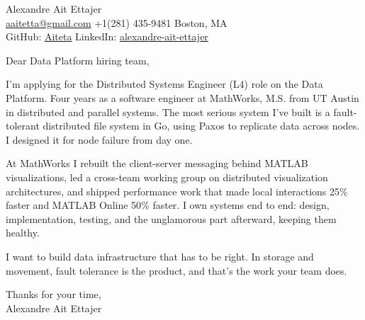 \documentclass{article}
\begin{document}
\begin{flushleft}
    {\Large Alexandre Ait Ettajer} \\
    \href{mailto:aaitetta@gmail.com}{aaitetta@gmail.com} \quad +1(281) 435-9481 \quad Boston, MA \\
    GitHub: \href{https://github.com/aiteta}{Aiteta} \quad LinkedIn: \href{https://www.linkedin.com/in/alexandre-ait-ettajer-65740b170/}{alexandre-ait-ettajer} \\
\end{flushleft}

\vspace{1em}

Dear Data Platform hiring team,

I'm applying for the Distributed Systems Engineer (L4) role on the Data Platform. Four years as a software engineer at MathWorks, M.S. from UT Austin in distributed and parallel systems. The most serious system I've built is a fault-tolerant distributed file system in Go, using Paxos to replicate data across nodes. I designed it for node failure from day one.

At MathWorks I rebuilt the client-server messaging behind MATLAB visualizations, led a cross-team working group on distributed visualization architectures, and shipped performance work that made local interactions 25\% faster and MATLAB Online 50\% faster. I own systems end to end: design, implementation, testing, and the unglamorous part afterward, keeping them healthy.

I want to build data infrastructure that has to be right. In storage and movement, fault tolerance is the product, and that's the work your team does.

Thanks for your time, \\
Alexandre Ait Ettajer
\end{document}
